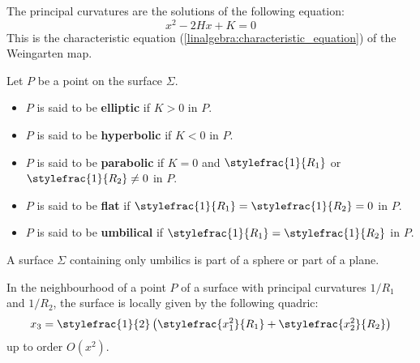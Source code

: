         \begin{property}
        	The principal curvatures are the solutions of the following equation:
        	\begin{equation}
        		x^2 - 2Hx + K = 0
        	\end{equation}
        	This is the characteristic equation (\ref{linalgebra:characteristic_equation}) of the Weingarten map.
        \end{property}
        
        \begin{definition}
        	Let $P$ be a point on the surface $\Sigma$.
	        \begin{itemize}
			\item $P$ is said to be \textbf{elliptic} if $K > 0$ in $P$.
	                \item $P$ is said to be \textbf{hyperbolic} if $K < 0$ in $P$.
        	        \item $P$ is said to be \textbf{parabolic} if $K = 0$ and $\stylefrac{1}{R_1}$ or $\stylefrac{1}{R_2}\neq0$ in $P$.
        	        \item $P$ is said to be \textbf{flat} if $\stylefrac{1}{R_1} = \stylefrac{1}{R_2} = 0$ in $P$.
        	        \item $P$ is said to be \textbf{umbilical} if $\stylefrac{1}{R_1} = \stylefrac{1}{R_2}$ in $P$.
        	\end{itemize}
        \end{definition}
        
        \begin{property}
        	A surface $\Sigma$ containing only umbilics is part of a sphere or part of a plane.
        \end{property}
        \begin{theorem}
        	In the neighbourhood of a point $P$ of a surface with principal curvatures $1/R_1$ and $1/R_2$, the surface is locally given by the following quadric:
	        \begin{equation}
            		x_3 = \stylefrac{1}{2}\left(\stylefrac{x_1^2}{R_1} + \stylefrac{x_2^2}{R_2}\right)
        	\end{equation}
	        up to order $O(x^2)$.
        \end{theorem}

